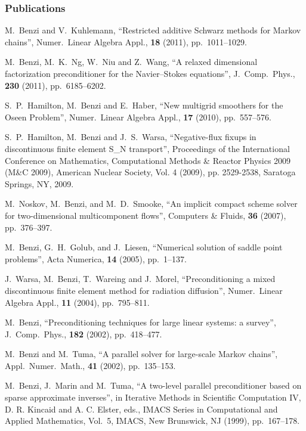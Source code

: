 \subsubsection*{Publications} 
\begin{enumerate*}

\item M.~Benzi and V.~Kuhlemann, ``Restricted additive Schwarz methods
for Markov chains'', Numer.~Linear Algebra Appl., {\bf 18} (2011), 
pp.~1011--1029.

\item M.~Benzi, M.~K.~Ng, W.~Niu and Z.~Wang, ``A relaxed dimensional
factorization preconditioner for the Navier--Stokes equations'', 
J.~Comp.~Phys., {\bf 230} (2011), pp.~6185--6202. 

\item S.~P.~Hamilton, M.~Benzi and E.~Haber, ``New multigrid
smoothers for the Oseen Problem'', Numer.~Linear Algebra Appl., {\bf 17}
(2010), pp.~557--576. 

\item S.~P.~Hamilton, M.~Benzi and J.~S.~Warsa, ``Negative-flux fixups in 
discontinuous finite element S_N transport'', 
Proceedings of the International Conference on Mathematics, 
Computational Methods & Reactor Physics 2009 (M&C 2009), 
American Nuclear Society, Vol. 4 (2009), pp. 2529-2538, 
Saratoga Springs, NY, 2009.

\item M.~Noskov, M.~Benzi, and M.~D.~Smooke, ``An implicit compact 
scheme solver for two-dimensional multicomponent flows'', Computers 
\& Fluids, {\bf 36} (2007), pp.~376--397. 

\item M.~Benzi, G.~H.~Golub, and J.~Liesen, ``Numerical solution of 
saddle point problems'', Acta Numerica, {\bf 14} (2005), pp.~1--137.

\item J.~Warsa, M.~Benzi, T.~Wareing and J.~Morel, ``Preconditioning a 
mixed discontinuous finite element method for radiation diffusion'', 
Numer.~Linear Algebra Appl., {\bf 11} (2004), pp.~795--811. 

\item M.~Benzi, ``Preconditioning techniques for large linear systems:
                  a survey'', J.~Comp.~Phys., {\bf 182} (2002), pp.~418--477.

\item M.~Benzi and M.~Tuma, 
``A parallel solver for large-scale Markov chains'',
                  Appl.~Numer.~Math., {\bf 41} (2002), pp.~135--153. 

\item M.~Benzi, J.~Marin and M.~Tuma, ``A two-level parallel preconditioner
based on sparse approximate inverses'', in Iterative Methods in Scientific 
Computation IV, D. R. Kincaid and A. C. Elster, eds., IMACS Series in 
Computational and Applied Mathematics, Vol.~5, IMACS, New Brunswick, 
NJ (1999), pp.~167--178. 


\end{enumerate*}

